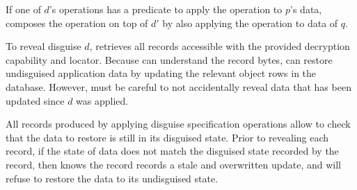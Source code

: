 If one of $d$'s operations has a predicate to apply the operation to $p$'s data, \sys
composes the operation on top of $d'$ by also applying the operation to data of $q$.

To reveal disguise $d$, \sys retrieves all records accessible with the provided decryption capability
and locator. Because \sys can understand the record bytes, \sys can restore undisguised application
data by updating the relevant object rows in the database.  However, \sys must be
careful to not accidentally reveal data that has been updated since $d$ was applied.  

All records produced by applying disguise specification operations allow \sys to check that the data
to restore is still in its disguised state. Prior to revealing each record, if the state of data does
not match the disguised state recorded by the record, then \sys knows the record records a stale and
overwritten update, and will refuse to restore the data to its undisguised state.
